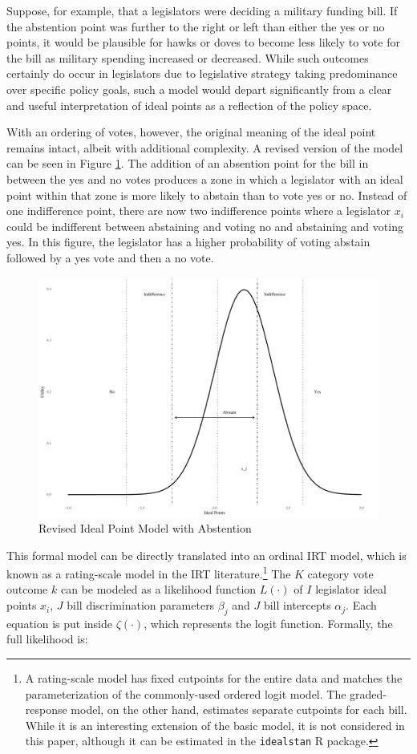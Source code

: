  	Suppose, for example, that a legislators were deciding a military funding bill. If the abstention point was further to the right or left than either the yes or no points, it would be plausible for hawks or doves to become less likely to vote for the bill as military spending increased or decreased. While such outcomes certainly do occur in legislators due to legislative strategy taking predominance over specific policy goals, such a model would depart significantly from a clear and useful interpretation of ideal points as a reflection of the policy space.
 	
 	With an ordering of votes, however, the original meaning of the ideal point remains intact, albeit with additional complexity. A revised version of the model can be seen in Figure \ref{abs_pts}. The addition of an absention point for the bill in between the yes and no votes produces a zone in which a legislator with an ideal point within that zone is more likely to abstain than to vote yes or no. Instead of one indifference point, there are now two indifference points where a legislator $x_i$ could be indifferent between abstaining and voting no and abstaining and voting yes. In this figure, the legislator has a higher probability of voting abstain followed by a yes vote and then a no vote.
 	 	\begin{figure}[h!]
 		\caption{Revised Ideal Point Model with Abstention}\label{abs_pts}
 		\includegraphics[width=0.9\linewidth]{ideal_pt_with_abstain}
 	\end{figure}
	
This formal model can be directly translated into an ordinal IRT model, which is known as a rating-scale model in the IRT literature.\footnote{A rating-scale model has fixed cutpoints for the entire data and matches the parameterization of the commonly-used ordered logit model. The graded-response model, on the other hand, estimates separate cutpoints for each bill. While it is an interesting extension of the basic model, it is not considered in this paper, although it can be estimated in the \texttt{idealstan} R package.} The $K$ category vote outcome $k$ can be modeled as a likelihood function $L(\cdot)$ of $I$ legislator ideal points $x_i$, $J$ bill discrimination parameters $\beta_j$ and $J$ bill intercepts $\alpha_j$. Each equation is put inside $\zeta(\cdot)$, which represents the logit function. Formally, the full likelihood is:
	
